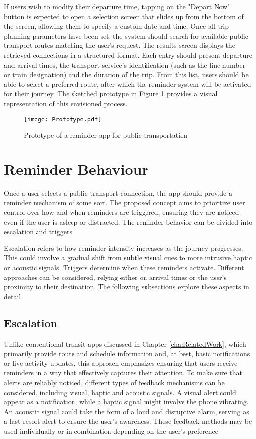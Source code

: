 If users wish to modify their departure time, tapping on the "Depart Now" button is expected to open a selection screen that slides up from the bottom of the screen, allowing them to specify a custom date and time. 
Once all trip planning parameters have been set, the system should search for available public transport routes matching the user's request.
The results screen displays the retrieved connections in a structured format. 
Each entry should present departure and arrival times, the transport service's identification (such as the line number or train designation) and the duration of the trip.
From this list, users should be able to select a preferred route, after which the reminder system will be activated for their journey.
The sketched prototype in Figure \ref{fig:prototype} provides a visual representation of this envisioned process.

\begin{figure}[htbp]
    \centering
    \texttt{[image: Prototype.pdf]}
    \caption{Prototype of a reminder app for public transportation}
    \label{fig:prototype}
\end{figure}

\section{Reminder Behaviour}
\label{sec:behaviour}
Once a user selects a public transport connection, the app should provide a reminder mechanism of some sort.
The proposed concept aims to prioritize user control over how and when reminders are triggered, ensuring they are noticed even if the user is asleep or distracted.
The reminder behavior can be divided into escalation and triggers. 

Escalation refers to how reminder intensity increases as the journey progresses. 
This could involve a gradual shift from subtle visual cues to more intrusive haptic or acoustic signals. 
Triggers determine when these reminders activate. 
Different approaches can be considered, relying either on arrival times or the user's proximity to their destination. 
The following subsections explore these aspects in detail.

\subsection{Escalation}
\label{sec:escalations}
Unlike conventional transit apps discussed in Chapter \ref{cha:RelatedWork}, which primarily provide route and schedule information and, at best, basic notifications or live activity updates, this approach emphasizes ensuring that users receive reminders in a way that effectively captures their attention. 
To make sure that alerts are reliably noticed, different types of feedback mechanisms can be considered, including visual, haptic and acoustic signals. 
A visual alert could appear as a notification, while a haptic signal might involve the phone vibrating.
An acoustic signal could take the form of a loud and disruptive alarm, serving as a last-resort alert to ensure the user's awareness.
These feedback methods may be used individually or in combination depending on the user's preference.

